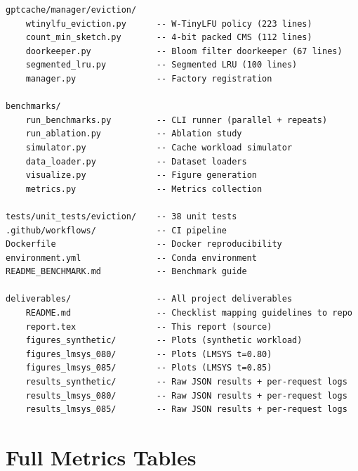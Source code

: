 \documentclass[11pt,a4paper]{article}
\begin{document}
\begin{lstlisting}
gptcache/manager/eviction/
    wtinylfu_eviction.py      -- W-TinyLFU policy (223 lines)
    count_min_sketch.py       -- 4-bit packed CMS (112 lines)
    doorkeeper.py             -- Bloom filter doorkeeper (67 lines)
    segmented_lru.py          -- Segmented LRU (100 lines)
    manager.py                -- Factory registration

benchmarks/
    run_benchmarks.py         -- CLI runner (parallel + repeats)
    run_ablation.py           -- Ablation study
    simulator.py              -- Cache workload simulator
    data_loader.py            -- Dataset loaders
    visualize.py              -- Figure generation
    metrics.py                -- Metrics collection

tests/unit_tests/eviction/    -- 38 unit tests
.github/workflows/            -- CI pipeline
Dockerfile                    -- Docker reproducibility
environment.yml               -- Conda environment
README_BENCHMARK.md           -- Benchmark guide

deliverables/                 -- All project deliverables
    README.md                 -- Checklist mapping guidelines to repo
    report.tex                -- This report (source)
    figures_synthetic/        -- Plots (synthetic workload)
    figures_lmsys_080/        -- Plots (LMSYS t=0.80)
    figures_lmsys_085/        -- Plots (LMSYS t=0.85)
    results_synthetic/        -- Raw JSON results + per-request logs
    results_lmsys_080/        -- Raw JSON results + per-request logs
    results_lmsys_085/        -- Raw JSON results + per-request logs
\end{lstlisting}

\section{Full Metrics Tables}
\end{document}
